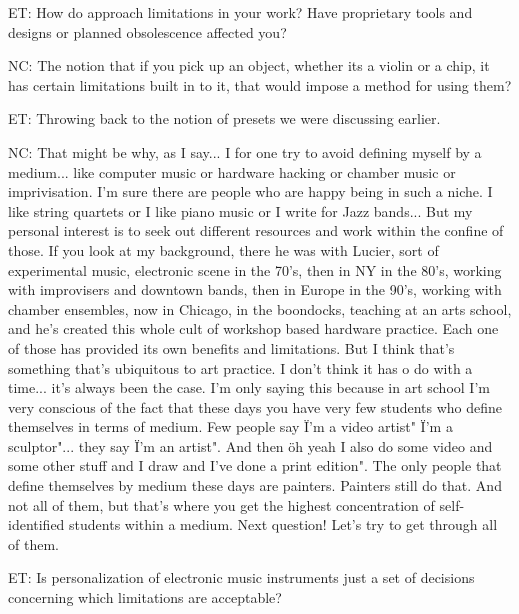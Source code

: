 ET: How do approach limitations in your work? Have proprietary tools and designs or planned obsolescence affected you? 

NC: The notion that if you pick up an object, whether its a violin or a chip, it has certain limitations built in to it, that would impose a method for using them? 

ET: Throwing back to the notion of presets we were discussing earlier. 

NC: That might be why, as I say... I for one try to avoid defining myself by a medium... like computer music or hardware hacking or chamber music or imprivisation. I'm sure there are people who are happy being in such a niche. I like string quartets or I like piano music or I write for Jazz bands... But my personal interest is to seek out different resources and work within the confine of those. If you look at my background, there he was with Lucier, sort of experimental music, electronic scene in the 70's, then in NY in the 80's, working with improvisers and downtown bands, then in Europe in the 90's, working with chamber ensembles, now in Chicago, in the boondocks, teaching at an arts school, and he's created this whole cult of workshop based hardware practice. Each one of those has provided its own benefits and limitations. But I think that's something that's ubiquitous to art practice. I don't think it has o do with a time... it's always been the case. I'm only saying this because in art school I'm very conscious of the fact that these days you have very few students who define themselves in terms of medium. Few people say \"I'm a video artist" \" I'm a sculptor"... they say \"I'm an artist". And then \"oh yeah I also do some video and some other stuff and I draw and I've done a print edition". The only people that define themselves by medium these days are painters. Painters still do that. And not all of them, but that's where you get the highest concentration of self-identified students within a medium. Next question! Let's try to get through all of them. 

ET: Is personalization of electronic music instruments just a set of decisions concerning which limitations are acceptable? 

